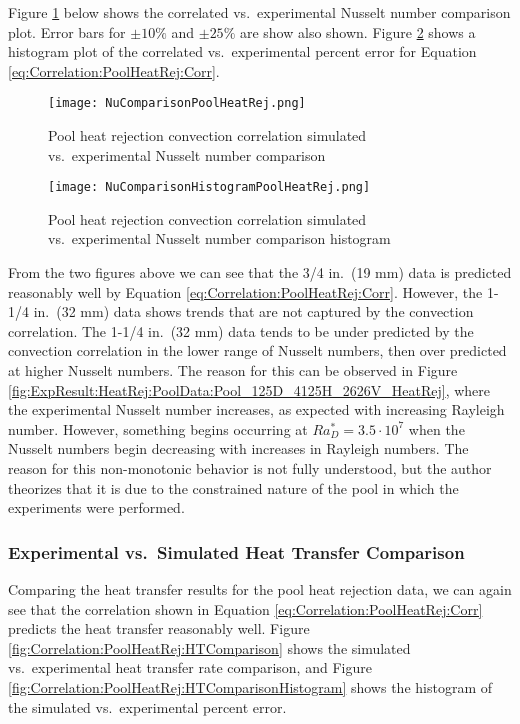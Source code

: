 Figure \ref{fig:Correlation:PoolHeatRej:NuComparison} below shows the correlated vs.\ experimental Nusselt number comparison plot. Error bars for $\pm10\%$ and $\pm25\%$ are show also shown. Figure \ref{fig:Correlation:PoolHeatRej:NuComparisonHistogram} shows a histogram plot of the correlated vs.\ experimental percent error for Equation \ref{eq:Correlation:PoolHeatRej:Corr}.
			
\begin{figure}
	\centering
	\texttt{[image: NuComparisonPoolHeatRej.png]}
	\caption{Pool heat rejection convection correlation simulated vs.\ experimental Nusselt number comparison}
	\label{fig:Correlation:PoolHeatRej:NuComparison}
\end{figure}

\begin{figure}
	\centering
	\texttt{[image: NuComparisonHistogramPoolHeatRej.png]}
	\caption{Pool heat rejection convection correlation simulated vs.\ experimental Nusselt number comparison histogram}
	\label{fig:Correlation:PoolHeatRej:NuComparisonHistogram}
\end{figure}
			
From the two figures above we can see that the 3/4 in.\ (19 mm) data is predicted reasonably well by Equation \ref{eq:Correlation:PoolHeatRej:Corr}. However, the 1-1/4 in.\ (32 mm) data shows trends that are not captured by the convection correlation. The 1-1/4 in.\ (32 mm) data tends to be under predicted by the convection correlation in the lower range of Nusselt numbers, then over predicted at higher Nusselt numbers. The reason for this can be observed in Figure \ref{fig:ExpResult:HeatRej:PoolData:Pool_125D_4125H_2626V_HeatRej}, where the experimental Nusselt number increases, as expected with increasing Rayleigh number. However, something begins occurring at $Ra_D^*=3.5\cdot10^7$ when the Nusselt numbers begin decreasing with increases in Rayleigh numbers. The reason for this non-monotonic behavior is not fully understood, but the author theorizes that it is due to the constrained nature of the pool in which the experiments were performed.
			
\subsubsection{Experimental vs.\ Simulated Heat Transfer Comparison}
			
Comparing the heat transfer results for the pool heat rejection data, we can again see that the correlation shown in Equation \ref{eq:Correlation:PoolHeatRej:Corr} predicts the heat transfer reasonably well. Figure \ref{fig:Correlation:PoolHeatRej:HTComparison} shows the simulated vs.\ experimental heat transfer rate comparison, and Figure \ref{fig:Correlation:PoolHeatRej:HTComparisonHistogram} shows the histogram of the simulated vs.\ experimental percent error.
			

